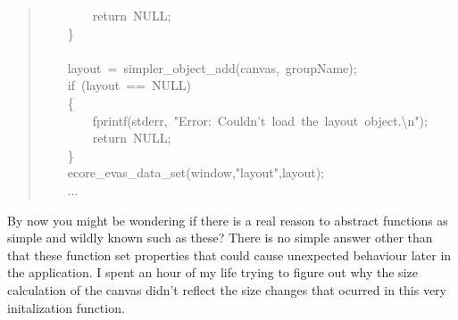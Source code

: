 \documentclass[12pt,a4paper,english]{book}
\begin{document}
\begin{quote}
{~~~~~~~~return~NULL;~\\
~~~~{\}}~\\
~\\
~~~~layout~=~simpler{\_}object{\_}add(canvas,~groupName);~\\
~~~~if~(layout~==~NULL)~\\
~~~~{\{}~\\
~~~~~~~~fprintf(stderr,~"Error:~Couldn't~load~the~layout~object.{\textbackslash}n");~\\
~~~~~~~~return~NULL;~\\
~~~~{\}}~\\
~~~~ecore{\_}evas{\_}data{\_}set(window,"layout",layout);~\\
~~~~...
}\end{quote}

By now you might be wondering if there is a real reason to abstract functions
as simple and wildly known such as these? There is no simple answer other than
that these function set properties that could cause unexpected behaviour later
in the application. I spent an hour of my life trying to figure out why the
size calculation of the canvas didn't reflect the size changes that ocurred in
this very initalization function.
\end{document}
